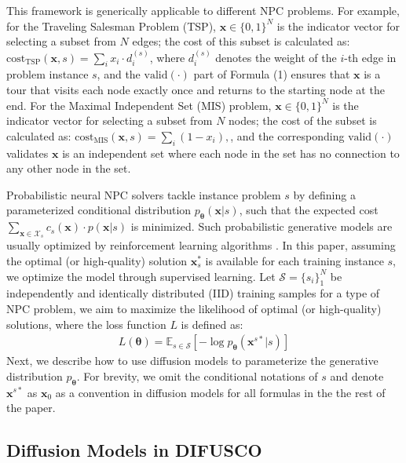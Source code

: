 \documentclass{article}
\theoremstyle{plain}
\theoremstyle{definition}
\theoremstyle{remark}
\newcommand{\method}{DIFUSCO}
\newcommand\CAL\mathcal
\begin{document}
This framework is generically applicable to different NPC problems.
For example, for the Traveling Salesman Problem (TSP), $\mathbf{x}\in\{0,1\}^N$ is the indicator vector for selecting a subset from $N$ edges; the cost of this subset is calculated as:
$\mathrm{cost}_{\mathrm{TSP}}(\mathbf{x}, s) = \sum_{i} x_i \cdot d^{(s)}_i$, where $d^{(s)}_i$ denotes the weight of the $i$-th edge in problem instance $s$, and the $\mathrm{valid}(\cdot)$ part of Formula (1) ensures
that $\mathbf{x}$ is a tour that visits each node exactly once and returns to the starting node at the end.
For the Maximal Independent Set (MIS) problem, $\mathbf{x}\in\{0,1\}^N$ is the indicator vector for selecting a subset from $N$ nodes; the cost of the subset is calculated as:
$\mathrm{cost}_{\mathrm{MIS}}(\mathbf{x}, s) = \sum_{i} (1 - x_i),$, and the corresponding $\mathrm{valid}(\cdot)$ validates $\mathbf{x}$ is an independent set where each node in the set has no connection to any other node in the set.


Probabilistic neural NPC solvers \citep{bello2016neural} tackle %
instance problem $s$ by defining a parameterized conditional distribution $p_{\boldsymbol{\theta}}(\mathbf{x}|s)$, such that the expected cost $\sum_{\mathbf{x} \in \CAL X_s} c_s(\mathbf{x}) \cdot p(\mathbf{x}|s)$ is minimized. Such probabilistic generative models are usually optimized by reinforcement learning algorithms \citep{williams1992simple,konda2000actor}.
In this paper, assuming the optimal (or high-quality) solution $\mathbf{x}^*_s$ is available for each training instance $s$, we %
optimize the model through supervised learning. Let $\CAL S = \{s_i\}^N_1$ be %
independently and identically distributed (IID) training samples for a type of NPC %
problem, we aim to maximize the likelihood of optimal (or high-quality) solutions, where the loss function $L$ is defined as:
\begin{align}
    L(\boldsymbol{\theta}) 
    = \mathbb{E}_{s \in \CAL S} \left[- \log p_{\boldsymbol{\theta}}(\mathbf{x}^{s*} | s)\right]
\end{align}
Next, we describe how to use diffusion models to parameterize the generative distribution $p_{\boldsymbol{\theta}}$.
For brevity, we omit the conditional notations of $s$ and denote $\mathbf{x}^{s*}$ as $\mathbf{x}_0$ as a convention in diffusion models for all formulas in the %
the rest of the paper.

\subsection{Diffusion Models in \method }\label{sec:elbo} %
\end{document}
